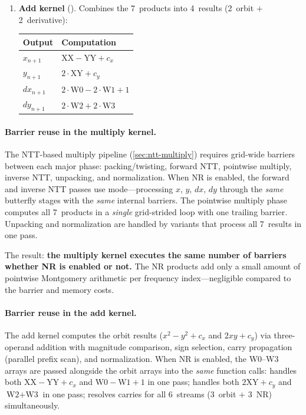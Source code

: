 \begin{enumerate}
\item \textbf{Add kernel} ().
  Combines the 7~products into 4~results (2~orbit $+$ 2~derivative):
  \begin{center}
  \small
  \begin{tabular}{ll}
  \hline
  \textbf{Output} & \textbf{Computation} \\
  \hline
  $x_{n+1}$ & $\text{XX} - \text{YY} + c_x$ \\
  $y_{n+1}$ & $2 \cdot \text{XY} + c_y$ \\
  $dx_{n+1}$ & $2 \cdot \text{W0} - 2 \cdot \text{W1} + 1$ \\
  $dy_{n+1}$ & $2 \cdot \text{W2} + 2 \cdot \text{W3}$ \\
  \hline
  \end{tabular}
  \end{center}
\end{enumerate}

\paragraph{Barrier reuse in the multiply kernel.}
The NTT-based multiply pipeline
(\cref{sec:ntt-multiply}) requires grid-wide barriers between each
major phase: packing/twisting, forward NTT, pointwise multiply, inverse
NTT, unpacking, and normalization.  When NR is enabled, the forward and
inverse NTT passes use  mode---processing
$x$, $y$, $dx$, $dy$ through the \emph{same} butterfly stages
with the \emph{same} internal barriers.  The pointwise multiply
phase computes all 7~products in a \emph{single} grid-strided loop with
one trailing barrier.  Unpacking and normalization are handled by
 variants that process all 7~results in one pass.

The result: \textbf{the multiply kernel executes the same number of
 barriers whether NR is enabled or not.}  The NR
products add only a small amount of pointwise Montgomery arithmetic
per frequency index---negligible compared to the barrier and memory
costs.

\paragraph{Barrier reuse in the add kernel.}
The add kernel computes the orbit results ($x^2 - y^2 + c_x$ and
$2xy + c_y$) via three-operand addition with magnitude comparison,
sign selection, carry propagation (parallel prefix scan), and
normalization.  When NR is enabled, the W0--W3 arrays are passed
alongside the orbit arrays into the \emph{same} function calls:
 handles both $\text{XX} - \text{YY} + c_x$ and
$\text{W0} - \text{W1} + 1$ in one pass;
 handles both $2\text{XY} + c_y$ and
$\text{W2} + \text{W3}$ in one pass;
 resolves carries for all
6~streams (3~orbit $+$ 3~NR) simultaneously.

